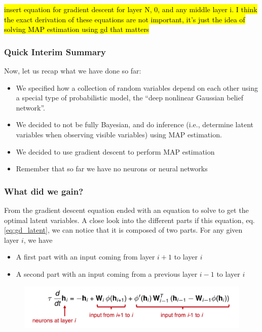 \documentclass[main]{subfiles}
\begin{document}
\hl{insert equation for gradient descent for layer N, 0, and any middle layer i. I think the exact derivation of these equations are not important, it's just the idea of solving MAP estimation using gd that matters}
\begin{equation}

\label{eq:gd_latent}
\end{equation}


\subsubsection{Quick Interim Summary}
Now, let us recap what we have done so far:
\begin{itemize}
    \item We specified how a collection of random variables depend on each other using a special type of probabilistic model, the “deep nonlinear Gaussian belief network”.
    \item We decided to not be fully Bayesian, and do inference (i.e., determine latent variables when observing visible variables) using MAP estimation.
    \item We decided to use gradient descent to perform MAP estimation
    \item Remember that so far we have no neurons or neural networks
\end{itemize}

\subsubsection{What did we gain?}
From the gradient descent equation ended with an equation to solve to get the optimal latent variables. A close look into the different parts if this equation, eq.\ref{eq:gd_latent}, we can notice that it is composed of two parts. For any given layer $i$, we have
\begin{itemize}
    \item A first part with an input coming from layer $i+1$ to layer $i$
    \item A second part with an input coming from a previous layer $i-1$ to layer $i$
\end{itemize}
\begin{figure}[H]
        \centering
        \includegraphics[width=0.9\linewidth]{06_PredictionErrorsDuringPerceptionAndLearning/figures/gd_equation.png}
        \label{fig:gd_equation_parts}
\end{figure}
\end{document}
